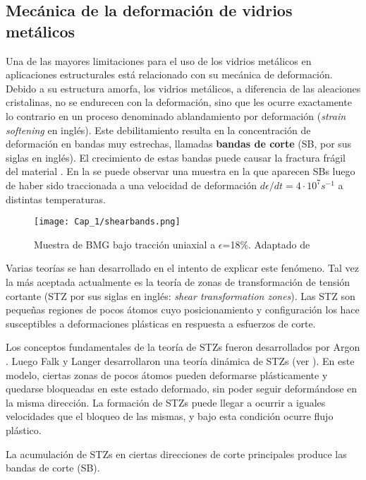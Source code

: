 \subsection{Mecánica de la deformación de vidrios metálicos}
\label{S1_1_3}

Una de las mayores limitaciones para el uso de los vidrios metálicos en aplicaciones estructurales está relacionado con su mecánica de deformación. Debido a su estructura amorfa, los vidrios metálicos, a diferencia de las aleaciones cristalinas, no se endurecen con la deformación, sino que les ocurre exactamente lo contrario en un proceso denominado ablandamiento por deformación (\textit{strain softening} en inglés). Este debilitamiento resulta en la concentración de deformación en bandas muy estrechas, llamadas \textbf{bandas de corte} (SB, por sus siglas en inglés). El crecimiento de estas bandas puede causar la fractura frágil del material \citep{schuh07}. En la  se puede observar una muestra en la que aparecen SBs luego de haber sido traccionada a una velocidad de deformación $d\epsilon/dt=4\cdot10^7s^{-1}$ a distintas temperaturas.

\begin{figure}[H]
 \centering
 \texttt{[image: Cap\_1/shearbands.png]}
 \caption[Bandas de corte]{Muestra de BMG bajo tracción uniaxial a $\epsilon$=18\%. Adaptado de \cite{albe13}}
 \label{C1:fg:shearbands}
\end{figure}

Varias teorías se han desarrollado en el intento de explicar este fenómeno. Tal vez la más aceptada actualmente es la teoría de zonas de transformación de tensión cortante (STZ por sus siglas en inglés: \textit{shear transformation zones}). Las STZ son pequeñas regiones de pocos átomos cuyo posicionamiento y configuración los hace susceptibles a deformaciones plásticas en respuesta a esfuerzos de corte.

Los conceptos fundamentales de la teoría de STZs fueron desarrollados por Argon \citep{argon79}. Luego Falk y Langer \citep{Falk98, Langer07} desarrollaron una teoría dinámica de STZs (ver ). En este modelo, ciertas zonas de pocos átomos pueden deformarse plásticamente y quedarse bloqueadas en este estado deformado, sin poder seguir deformándose en la misma dirección. La formación de STZs puede llegar a ocurrir a iguales velocidades que el bloqueo de las mismas, y bajo esta condición ocurre flujo plástico.

La acumulación de STZs en ciertas direcciones de corte principales produce las bandas de corte (SB).

